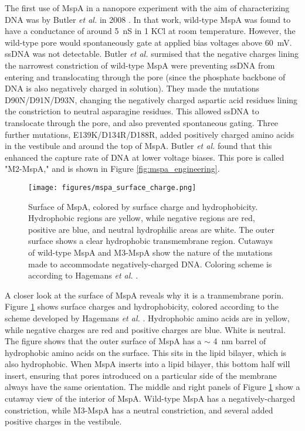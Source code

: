 The first use of MspA in a nanopore experiment with the aim of characterizing DNA was by Butler \textit{et al.} in 2008 \citep{Butler2008}.  In that work, wild-type MspA was found to have a conductance of around \SI{5}{\nano\siemens} in \SI{1}{\Molar} KCl at room temperature.  However, the wild-type pore would spontaneously gate at applied bias voltages above \SI{60}{\mV}.  ssDNA was not detectable.  Butler \textit{et al.} surmised that the negative charges lining the narrowest constriction of wild-type MspA were preventing ssDNA from entering and translocating through the pore (since the phosphate backbone of DNA is also negatively charged in solution).  They made the mutations D90N/D91N/D93N, changing the negatively charged aspartic acid residues lining the constriction to neutral asparagine residues.  This allowed ssDNA to translocate through the pore, and also prevented spontaneous gating.  Three further mutations, E139K/D134R/D188R, added positively charged amino acids in the vestibule and around the top of MspA.  Butler \textit{et al.} found that this enhanced the capture rate of DNA at lower voltage biases.  This pore is called "M2-MspA," and is shown in Figure \ref{fig:mspa_engineering}.

\begin{figure}[h]
\begin{centering}
\texttt{[image: figures/mspa\_surface\_charge.png]}
\caption[Hydrophobicity and surface charge of MspA]{Surface of MspA, colored by surface charge and hydrophobicity.  Hydrophobic regions are yellow, while negative regions are red, positive are blue, and neutral hydrophilic areas are white.  The outer surface shows a clear hydrophobic transmembrane region.  Cutaways of wild-type MspA and M3-MspA show the nature of the mutations made to accommodate negatively-charged DNA.  Coloring scheme is according to Hagemans \textit{et al.} \citep{Hagemans2015}.}
\label{fig:mspa_engineering_charge}
\end{centering}
\end{figure}

A closer look at the surface of MspA reveals why it is a tranmembrane porin.  Figure \ref{fig:mspa_engineering_charge} shows surface charges and hydrophobicity, colored according to the scheme developed by Hagemans \textit{et al.} \citep{Hagemans2015}.  Hydrophobic amino acids are in yellow, while negative charges are red and positive charges are blue.  White is neutral.  The figure shows that the outer surface of MspA has a $\sim$ \SI{4}{\nm} barrel of hydrophobic amino acids on the surface.  This sits in the lipid bilayer, which is also hydrophobic.  When MspA inserts into a lipid bilayer, this bottom half will insert, ensuring that pores introduced on a particular side of the membrane always have the same orientation.  The middle and right panels of Figure \ref{fig:mspa_engineering_charge} show a cutaway view of the interior of MspA.  Wild-type MspA has a negatively-charged constriction, while M3-MspA has a neutral constriction, and several added positive charges in the vestibule.

